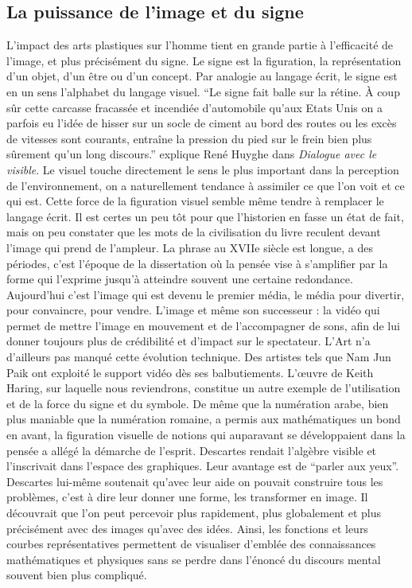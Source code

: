 \subsection{La puissance de l'image et du signe}
\xspace

	L'impact des arts plastiques sur l'homme tient en grande partie à l'efficacité de l'image, et plus précisément du signe. Le signe est la figuration, la représentation d'un objet, d'un être ou d'un concept. Par analogie au langage écrit, le signe est en un sens l'alphabet du langage visuel. “Le signe fait balle sur la rétine. À coup sûr cette carcasse fracassée et incendiée d'automobile qu'aux Etats Unis on a parfois eu l'idée de hisser sur un socle de ciment au bord des routes ou les excès de vitesses sont courants, entraîne la pression du pied sur le frein bien plus sûrement qu'un long discours.” explique René Huyghe dans \emph{Dialogue avec le visible}. Le visuel touche directement le sens le plus important dans la perception de l'environnement, on a naturellement tendance à assimiler ce que l'on voit et ce qui est. Cette force de la figuration visuel semble même tendre à remplacer le langage écrit. Il est certes un peu tôt pour que l'historien en fasse un état de fait, mais on peu constater que les mots de la civilisation du livre reculent devant l'image qui prend de l'ampleur. La phrase au XVIIe siècle est longue, a des périodes, c'est l'époque de la dissertation où la pensée vise à s'amplifier par la forme qui l'exprime jusqu'à atteindre souvent une certaine redondance. Aujourd'hui c'est l'image qui est devenu le premier média, le média pour divertir, pour convaincre, pour vendre. L'image et même son successeur : la vidéo qui permet de mettre l'image en mouvement et de l'accompagner de sons, afin de lui donner toujours plus de crédibilité et d'impact sur le spectateur. L'Art n'a d'ailleurs pas manqué cette évolution technique. Des artistes tels que Nam Jun Paik ont exploité le support vidéo dès ses balbutiements. L'\oe{}uvre de Keith Haring, sur laquelle nous reviendrons, constitue un autre exemple de l'utilisation et de la force du signe et du symbole. De même que la numération arabe, bien plus maniable que la numération romaine, a permis aux mathématiques un bond en avant, la figuration visuelle de notions qui auparavant se développaient dans la pensée a allégé la démarche de l'esprit. Descartes rendait l'algèbre visible et l'inscrivait dans l'espace des graphiques. Leur avantage est de “parler aux yeux”. Descartes lui-même soutenait qu'avec leur aide on pouvait construire tous les problèmes, c'est à dire leur donner une forme, les transformer en image. Il découvrait que l'on peut percevoir plus rapidement, plus globalement et plus précisément avec des images qu'avec des idées. Ainsi, les fonctions et leurs courbes représentatives permettent de visualiser d'emblée des connaissances mathématiques et physiques sans se perdre dans l'énoncé du discours mental souvent bien plus compliqué. 


